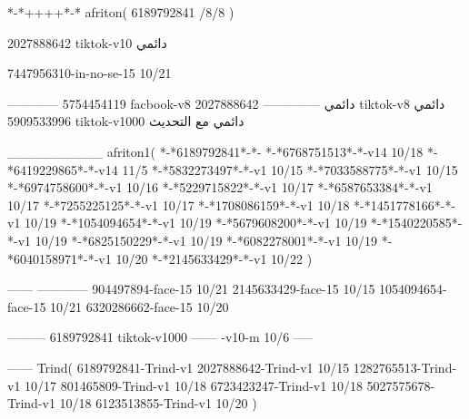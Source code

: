 *-*++++*-*
afriton(
6189792841 /8/8
)

2027888642 tiktok-v10
دائمي


7447956310-in-no-se-15 10/21

------------
5754454119 facbook-v8
دائمي
--------------
2027888642 tiktok-v8
دائمي
5909533996 tiktok-v1000
دائمي مع التحديث

__________
afriton1(
*-*6189792841*-*-
*-*6768751513*-*-v14 10/18
*-*6419229865*-*-v14 11/5
*-*5832273497*-*-v1 10/15
*-*7033588775*-*-v1 10/15
*-*6974758600*-*-v1 10/16
*-*5229715822*-*-v1 10/17
*-*6587653384*-*-v1 10/17
*-*7255225125*-*-v1 10/17
*-*1708086159*-*-v1 10/18
*-*1451778166*-*-v1 10/19
*-*1054094654*-*-v1 10/19
*-*5679608200*-*-v1 10/19
*-*1540220585*-*-v1 10/19
*-*6825150229*-*-v1 10/19
*-*6082278001*-*-v1 10/19
*-*6040158971*-*-v1 10/20
*-*2145633429*-*-v1 10/22
)

------
------------
904497894-face-15 10/21
2145633429-face-15 10/15
1054094654-face-15 10/21
6320286662-face-15 10/20

---------
6189792841 tiktok-v1000
------
-v10-m 10/6
-----

------
Trind(
6189792841-Trind-v1 
2027888642-Trind-v1 10/15
1282765513-Trind-v1 10/17
801465809-Trind-v1 10/18
6723423247-Trind-v1 10/18
5027575678-Trind-v1 10/18
6123513855-Trind-v1 10/20
)
